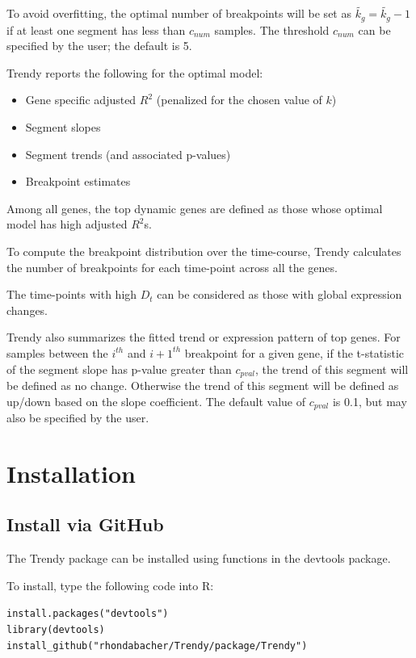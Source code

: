 \documentclass{article}\usepackage[]{graphicx}\usepackage[usenames,dvipsnames]{color}
\newcommand{\hlstr}[1]{\textcolor[rgb]{0.251,0.627,0.251}{#1}}%
\newcommand{\hlstd}[1]{\textcolor[rgb]{0.251,0.251,0.251}{#1}}%
\newcommand{\hlkwd}[1]{\textcolor[rgb]{0.878,0.439,0.125}{#1}}%
\newenvironment{knitrout}{}{} %
\begin{document}
To avoid overfitting, the optimal number of breakpoints will be set as
$\tilde{k_g} = \tilde{k_g} -1$ if at least one segment has less than $c_{num}$ samples. The threshold
$c_{num}$ can be specified by the user; the 
default is 5.


Trendy reports the following for the optimal model:
\begin{itemize}
  \item Gene specific adjusted $R^2$ (penalized for the chosen value of $k$)
  \item Segment slopes
  \item Segment trends (and associated p-values)
  \item Breakpoint estimates
\end{itemize}

Among all genes, the top dynamic genes are defined as those whose optimal model has high adjusted $R^2$s.

To compute the breakpoint distribution over the time-course, Trendy calculates the number of
breakpoints for each time-point across all the genes.

The time-points with high $D_t$ can be considered as those with global expression changes.

Trendy also summarizes the fitted trend or expression pattern of top genes. For samples between the $i^{th}$
and $i+1 ^{th}$ breakpoint for a given gene, if the t-statistic of
the segment slope has p-value greater than $c_{pval}$,
the trend of this segment will be defined as no change. Otherwise the
trend of this segment will be defined as up/down based on the slope coefficient.
The default value of $c_{pval}$ is 0.1, but may also be specified by the user.

\section{Installation}

\subsection{Install via GitHub}

The Trendy package can be installed using functions in the devtools package.

To install, type the following code into R:
\begin{knitrout}
\color{fgcolor}\begin{kframe}
\begin{alltt}
\hlkwd{install.packages}\hlstd{(}\hlstr{"devtools"}\hlstd{)}
\hlkwd{library}\hlstd{(devtools)}
\hlkwd{install_github}\hlstd{(}\hlstr{"rhondabacher/Trendy/package/Trendy"}\hlstd{)}
\end{alltt}
\end{kframe}
\end{knitrout}
\end{document}
